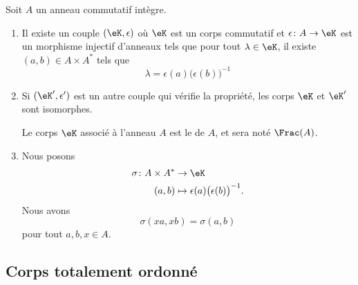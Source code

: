 \begin{theoremDef}     \label{ThogbhWgo}
	Soit \( A\) un anneau commutatif intègre.

	\begin{enumerate}
		\item
		      Il existe un couple \( (\eK,\epsilon)\) où \( \eK\) est un corps commutatif et \( \epsilon\colon A\to \eK\) est un morphisme injectif d'anneaux tels que pour tout \( \lambda\in\eK\), il existe \( (a,b)\in A\times A^*\) tels que
		      \begin{equation}
			      \lambda=\epsilon(a)\big( \epsilon(b) \big)^{-1}
		      \end{equation}
		\item
		      Si \( (\eK',\epsilon')\) est un autre couple qui vérifie la propriété, les corps \( \eK\) et \( \eK'\) sont isomorphes.

		      Le corps \( \eK\) associé à l'anneau \( A\) est le  de \( A\), et sera noté \( \Frac(A)\).

		\item
		      Nous posons
		      \begin{equation}
			      \begin{aligned}
				      \sigma\colon A\times A^* & \to \eK                                          \\
				      (a,b)                    & \mapsto \epsilon(a)\big( \epsilon(b) \big)^{-1}.
			      \end{aligned}
		      \end{equation}
		      Nous avons
		      \begin{equation}
			      \sigma(xa, xb)=\sigma(a,b)
		      \end{equation}
		      pour tout \( a,b,x\in A\).
	\end{enumerate}
\end{theoremDef}


\subsection{Corps totalement ordonné}

